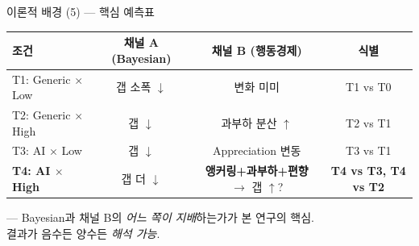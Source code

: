 \documentclass[aspectratio=169]{beamer}
\begin{document}
\begin{frame}{이론적 배경 (5) --- 핵심 예측표}
  \small
  \begin{tabular}{lccc}
    \hline
    \textbf{조건} & \textbf{채널 A (Bayesian)} & \textbf{채널 B (행동경제)} & \textbf{식별} \\
    \hline
    T1: Generic $\times$ Low & 갭 소폭 $\downarrow$ & 변화 미미 & T1 vs T0 \\
    T2: Generic $\times$ High & 갭 $\downarrow$ & 과부하 분산 $\uparrow$ & T2 vs T1 \\
    T3: AI $\times$ Low & 갭 $\downarrow$ & Appreciation 변동 & T3 vs T1 \\
    \textbf{T4: AI $\times$ High} & 갭 더 $\downarrow$ & \textbf{앵커링+과부하+편향} $\rightarrow$ 갭 $\uparrow$? & \textbf{T4 vs T3, T4 vs T2} \\
    \hline
  \end{tabular}

  \vspace{0.6em}
   --- Bayesian과 채널 B의 \emph{어느 쪽이 지배}하는가가 본 연구의 핵심.\\
  결과가 음수든 양수든 \emph{해석 가능}.
\end{frame}

\end{document}
